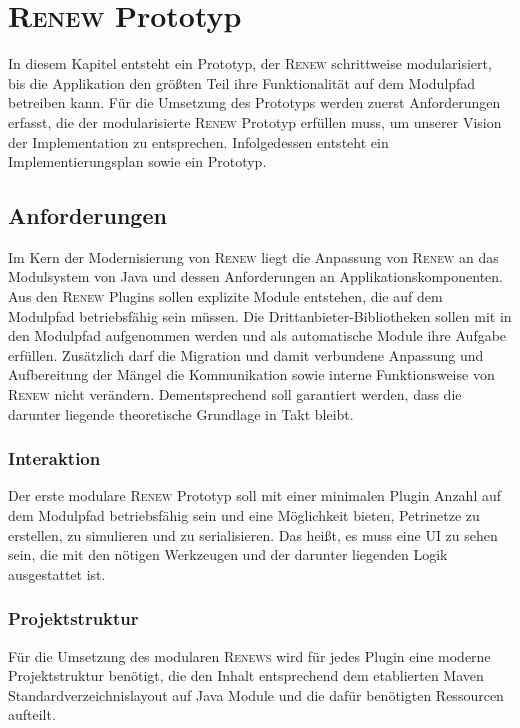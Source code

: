 \chapter{\textsc{Renew} Prototyp} 
	In diesem Kapitel entsteht ein Prototyp, der \textsc{Renew} schrittweise modularisiert, bis die Applikation den größten Teil ihre Funktionalität auf dem Modulpfad betreiben kann. \newline
	Für die Umsetzung des Prototyps werden zuerst Anforderungen erfasst, die der modularisierte \textsc{Renew} Prototyp erfüllen muss, um unserer Vision der Implementation zu entsprechen. Infolgedessen entsteht ein Implementierungsplan sowie ein Prototyp. 

\section{Anforderungen} \label{sec:anforderungen}
	Im Kern der Modernisierung von \textsc{Renew} liegt die Anpassung von \textsc{Renew} an das Modulsystem von Java und dessen Anforderungen an Applikationskomponenten. Aus den \textsc{Renew} Plugins sollen explizite Module entstehen, die auf dem Modulpfad betriebsfähig sein müssen. Die Drittanbieter-Bibliotheken sollen mit in den Modulpfad aufgenommen werden und als automatische Module ihre Aufgabe erfüllen. Zusätzlich darf die Migration und damit verbundene Anpassung und Aufbereitung der Mängel die Kommunikation sowie interne Funktionsweise von \textsc{Renew} nicht verändern. Dementsprechend soll garantiert werden, dass die darunter liegende theoretische Grundlage in Takt bleibt. 

\subsection{Interaktion}
	Der erste modulare \textsc{Renew} Prototyp soll mit einer minimalen Plugin Anzahl auf dem Modulpfad betriebsfähig sein und eine Möglichkeit bieten, Petrinetze zu erstellen, zu simulieren und zu serialisieren. Das heißt, es muss eine UI zu sehen sein, die mit den nötigen Werkzeugen und der darunter liegenden Logik ausgestattet ist. 

\subsection{Projektstruktur}
	Für die Umsetzung des modularen \textsc{Renews} wird für jedes Plugin eine moderne Projektstruktur benötigt, die den Inhalt entsprechend dem etablierten Maven Standardverzeichnislayout auf Java Module und die dafür benötigten Ressourcen aufteilt. 

